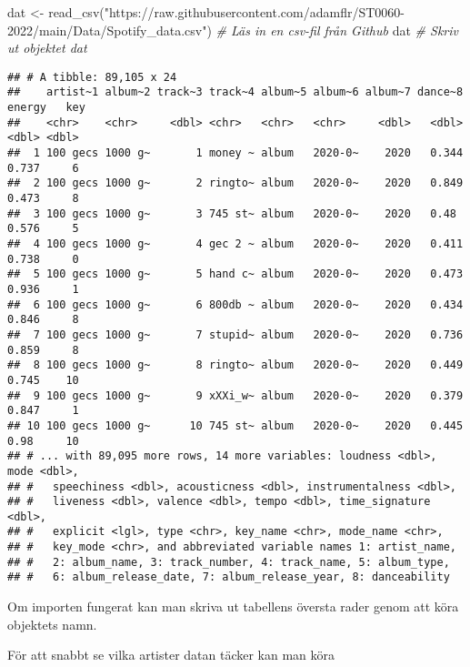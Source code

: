 \documentclass[
]{book}
\newenvironment{Shaded}{\begin{snugshade}}{\end{snugshade}}
\newcommand{\CommentTok}[1]{\textcolor[rgb]{0.56,0.35,0.01}{\textit{#1}}}
\newcommand{\FunctionTok}[1]{\textcolor[rgb]{0.00,0.00,0.00}{#1}}
\newcommand{\NormalTok}[1]{#1}
\newcommand{\OtherTok}[1]{\textcolor[rgb]{0.56,0.35,0.01}{#1}}
\newcommand{\SpecialCharTok}[1]{\textcolor[rgb]{0.00,0.00,0.00}{#1}}
\newcommand{\StringTok}[1]{\textcolor[rgb]{0.31,0.60,0.02}{#1}}
\theoremstyle{definition}
\theoremstyle{definition}
\theoremstyle{definition}
\theoremstyle{definition}
\theoremstyle{remark}
\begin{document}
\begin{Shaded}
\begin{Highlighting}[]
\NormalTok{dat }\OtherTok{\textless{}{-}} \FunctionTok{read\_csv}\NormalTok{(}\StringTok{"https://raw.githubusercontent.com/adamflr/ST0060{-}2022/main/Data/Spotify\_data.csv"}\NormalTok{) }
                                       \CommentTok{\# Läs in en csv{-}fil från Github}
\NormalTok{dat                                    }\CommentTok{\# Skriv ut objektet dat}
\end{Highlighting}
\end{Shaded}

\begin{verbatim}
## # A tibble: 89,105 x 24
##    artist~1 album~2 track~3 track~4 album~5 album~6 album~7 dance~8 energy   key
##    <chr>    <chr>     <dbl> <chr>   <chr>   <chr>     <dbl>   <dbl>  <dbl> <dbl>
##  1 100 gecs 1000 g~       1 money ~ album   2020-0~    2020   0.344  0.737     6
##  2 100 gecs 1000 g~       2 ringto~ album   2020-0~    2020   0.849  0.473     8
##  3 100 gecs 1000 g~       3 745 st~ album   2020-0~    2020   0.48   0.576     5
##  4 100 gecs 1000 g~       4 gec 2 ~ album   2020-0~    2020   0.411  0.738     0
##  5 100 gecs 1000 g~       5 hand c~ album   2020-0~    2020   0.473  0.936     1
##  6 100 gecs 1000 g~       6 800db ~ album   2020-0~    2020   0.434  0.846     8
##  7 100 gecs 1000 g~       7 stupid~ album   2020-0~    2020   0.736  0.859     8
##  8 100 gecs 1000 g~       8 ringto~ album   2020-0~    2020   0.449  0.745    10
##  9 100 gecs 1000 g~       9 xXXi_w~ album   2020-0~    2020   0.379  0.847     1
## 10 100 gecs 1000 g~      10 745 st~ album   2020-0~    2020   0.445  0.98     10
## # ... with 89,095 more rows, 14 more variables: loudness <dbl>, mode <dbl>,
## #   speechiness <dbl>, acousticness <dbl>, instrumentalness <dbl>,
## #   liveness <dbl>, valence <dbl>, tempo <dbl>, time_signature <dbl>,
## #   explicit <lgl>, type <chr>, key_name <chr>, mode_name <chr>,
## #   key_mode <chr>, and abbreviated variable names 1: artist_name,
## #   2: album_name, 3: track_number, 4: track_name, 5: album_type,
## #   6: album_release_date, 7: album_release_year, 8: danceability
\end{verbatim}

Om importen fungerat kan man skriva ut tabellens översta rader genom att köra objektets namn.

För att snabbt se vilka artister datan täcker kan man köra

\begin{Shaded}
\end{Shaded}
\end{document}

